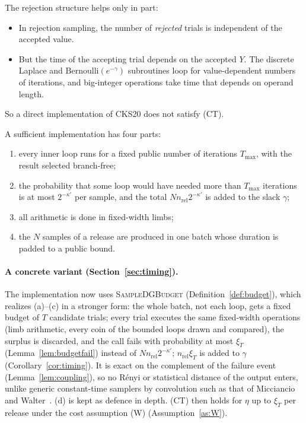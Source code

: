 The rejection structure helps only in part:
\begin{itemize}[nosep]
  \item In rejection sampling, the number of \emph{rejected} trials is independent of the accepted value.
  \item But the time of the accepting trial depends on the accepted $Y$. The discrete Laplace and $\mathrm{Bernoulli}(e^{-\gamma})$ subroutines loop for value-dependent numbers of iterations, and big-integer operations take time that depends on operand length.
\end{itemize}
So a direct implementation of CKS20 does not satisfy (CT).

A sufficient implementation has four parts:
\begin{enumerate}[nosep,label=(\alph*)]
  \item every inner loop runs for a fixed public number of iterations $T_{\max}$, with the result selected branch-free;
  \item the probability that some loop would have needed more than $T_{\max}$ iterations is at most $2^{-\kappa'}$ per sample, and the total $Nn_{\mathrm{rel}}2^{-\kappa'}$ is added to the slack $\gamma$;
  \item all arithmetic is done in fixed-width limbs;
  \item the $N$ samples of a release are produced in one batch whose duration is padded to a public bound.
\end{enumerate}
\paragraph{A concrete variant (Section~\ref{sec:timing}).} The implementation now uses \textsc{SampleDGBudget} (Definition~\ref{def:budget}), which realizes (a)--(c) in a stronger form: the whole batch, not each loop, gets a fixed budget of $T$ candidate trials; every trial executes the same fixed-width operations (limb arithmetic, every coin of the bounded loops drawn and compared), the surplus is discarded, and the call fails with probability at most $\xi_T$ (Lemma~\ref{lem:budgetfail}) instead of $Nn_{\mathrm{rel}}2^{-\kappa'}$; $n_{\mathrm{rel}}\xi_T$ is added to $\gamma$ (Corollary~\ref{cor:timing}). It is exact on the complement of the failure event (Lemma~\ref{lem:coupling}), so no R\'enyi or statistical distance of the output enters, unlike generic constant-time samplers by convolution such as that of Micciancio and Walter~\cite{MW17}. (d) is kept as defence in depth. (CT) then holds for $\eta$ up to $\xi_T$ per release under the cost assumption (W) (Assumption~\ref{as:W}).

